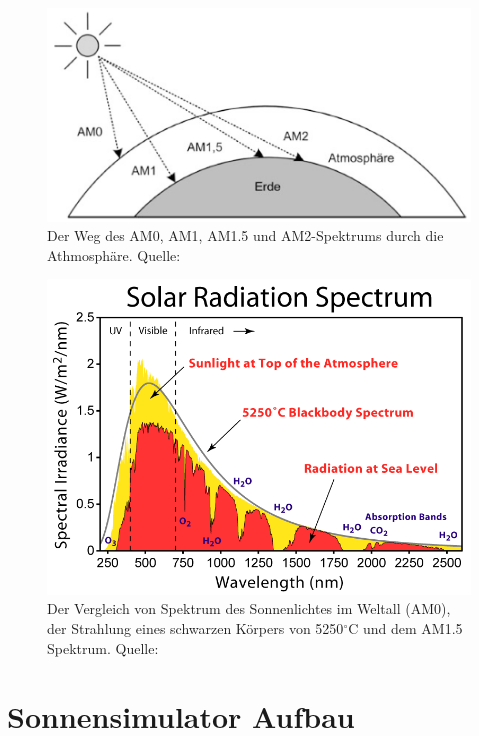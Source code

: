 \documentclass[a4paper,bibtotoc,oneside]{scrbook}
\begin{document}
\begin{figure}[htbp]
\centering
\includegraphics[width=125mm]{img/airmass2.png}
\caption[Sonnenspektrum]{Der Weg des AM0, AM1, AM1.5 und AM2-Spektrums durch die Athmosphäre. Quelle: \cite{pv}}\label{airmass}
\end{figure}

\begin{figure}[htbp]
\centering
\includegraphics[width=125mm]{img/Solar_Spectrum.png}
\caption[Sonnenspektrum]{Der Vergleich von Spektrum des Sonnenlichtes im Weltall (AM0), der Strahlung eines schwarzen Körpers von 5250$^{\circ}$C und dem AM1.5 Spektrum. Quelle: \cite{sun}}\label{sunspec}
\end{figure}


\section{Sonnensimulator Aufbau}\thispagestyle{empty}
\end{document}
